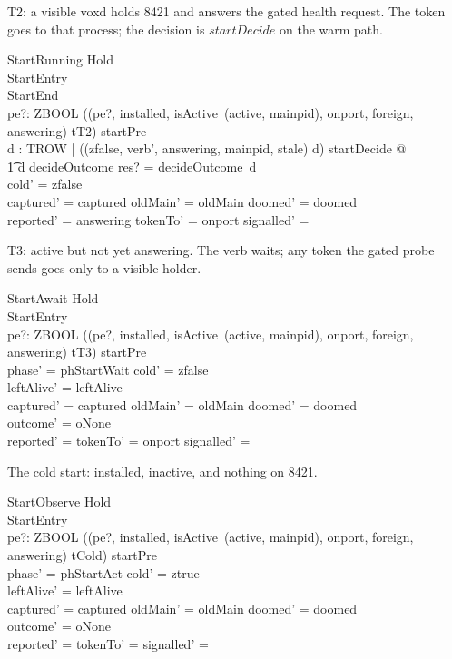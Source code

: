 \documentclass[a4paper,10pt,fleqn]{article}
\begin{document}
T2: a visible voxd holds 8421 and answers the gated health request. The token
goes to that process; the decision is $startDecide$ on the warm path.

\begin{schema}{StartRunning}
  Hold \\
  StartEntry \\
  StartEnd \\
  pe?: ZBOOL
\where
  ((pe?, installed, isActive~(active, mainpid), onport, foreign, answering) \mapsto tT2)
    \in startPre \\
  \exists d : TROW | ((zfalse, verb', answering, mainpid, stale) \mapsto d)
    \in startDecide @ \\
  \t1 d \in \dom decideOutcome \land res? = decideOutcome~d \\
  cold' = zfalse \\
  captured' = captured \land oldMain' = oldMain \land doomed' = doomed \\
  reported' = answering \land tokenTo' = onport \land
    signalled' = \emptyset
\end{schema}

T3: active but not yet answering. The verb waits; any token the gated probe
sends goes only to a visible holder.

\begin{schema}{StartAwait}
  Hold \\
  StartEntry \\
  pe?: ZBOOL
\where
  ((pe?, installed, isActive~(active, mainpid), onport, foreign, answering) \mapsto tT3)
    \in startPre \\
  phase' = phStartWait \land cold' = zfalse \\
  leftAlive' = leftAlive \\
  captured' = captured \land oldMain' = oldMain \land doomed' = doomed \\
  outcome' = oNone \\
  reported' = \emptyset \land tokenTo' = onport \land
    signalled' = \emptyset
\end{schema}

The cold start: installed, inactive, and nothing on 8421.

\begin{schema}{StartObserve}
  Hold \\
  StartEntry \\
  pe?: ZBOOL
\where
  ((pe?, installed, isActive~(active, mainpid), onport, foreign, answering) \mapsto tCold)
    \in startPre \\
  phase' = phStartAct \land cold' = ztrue \\
  leftAlive' = leftAlive \\
  captured' = captured \land oldMain' = oldMain \land doomed' = doomed \\
  outcome' = oNone \\
  reported' = \emptyset \land tokenTo' = \emptyset \land
    signalled' = \emptyset
\end{schema}
\end{document}
